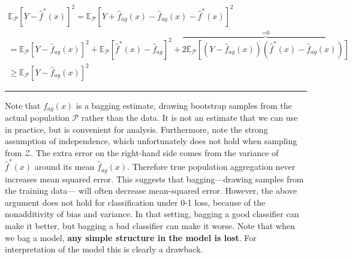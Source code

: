 \documentclass[twoside]{article}
\newenvironment{proof}{{\bf Proof:}}{\hfill\rule{2mm}{2mm}}
\begin{document}
\begin{proof}
\begin{align*}
       \mathbb{E}_{\mathcal{P}}[Y - \hat{f}^*(x)]^2 = \mathbb{E}_{\mathcal{P}}[Y +  \hat{f}_{ag}(x)- \hat{f}_{ag}(x) - \hat{f}^*(x)]^2  \\
       = \mathbb{E}_{\mathcal{P}}[Y - \hat{f}_{ag}(x)]^2 + \mathbb{E}_{\mathcal{P}}[\hat{f}^*(x) - \hat{f}_{ag} ]^2 + \overbrace{2\mathbb{E}_{\mathcal{P}}[(Y-\hat{f}_{ag}(x))( \hat{f}^*(x) - \hat{f}_{ag}(x))]}^\text{=0} \\
       \geq \mathbb{E}_{\mathcal{P}}[Y - \hat{f}_{ag}(x)]^2
\end{align*}
\end{proof}


Note that
$f_{ag}(x)$ is a bagging estimate, drawing bootstrap samples from the actual population $\mathcal{P}$ rather than the data. It is not an estimate that we can use in practice, but is convenient for analysis. Furthermore, note the strong assumption of independence, which unfortunately does not hold when sampling from $\boldsymbol{\mathcal{Z}}$. The extra error on the right-hand side comes from the variance of $\hat{f}^*(x)$ around its mean $\hat{f}_{ag}(x)$. Therefore true population aggregation never increases mean squared error. This suggests that bagging—drawing samples
from the training data— will often decrease mean-squared error.
However, the above argument does not hold for classification under 0-1 loss, because of the nonadditivity of bias and variance. In that setting, bagging a good classifier can make it better, but bagging a bad classifier can make it worse. Note that when we bag a model, \textbf{any simple structure in the model is lost}. For interpretation of the model this is clearly a drawback. 
\end{document}
